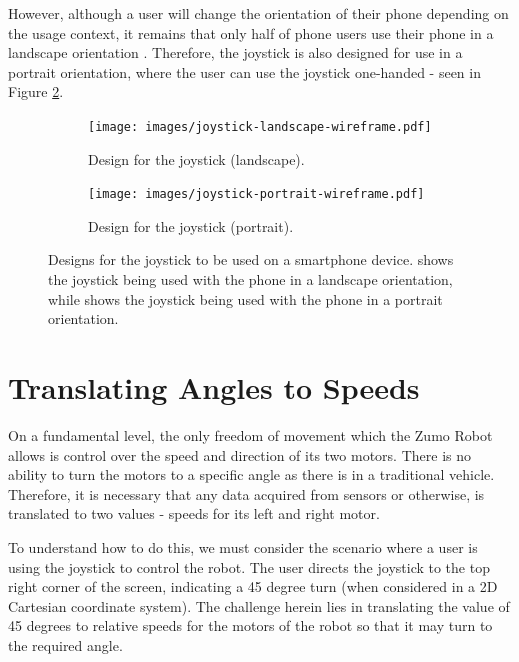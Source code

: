 \documentclass{l4proj}
\begin{document}
However, although a user will change the orientation of their phone depending on the usage context, it remains that only half of phone users use their phone in a landscape orientation \citep{hoober2017design}. Therefore, the joystick is also designed for use in a portrait orientation, where the user can use the joystick one-handed - seen in Figure \ref{fig:joystick-portrait-wireframe}.

\begin{figure}[!ht]
    \centering
    \begin{subfigure}{0.66\textwidth}
        \centering
        \texttt{[image: images/joystick-landscape-wireframe.pdf]}
        \caption{Design for the joystick (landscape).}
        \label{fig:joystick-landscape-wireframe} 
    \end{subfigure}
    \begin{subfigure}{0.33\textwidth}
        \centering
        \texttt{[image: images/joystick-portrait-wireframe.pdf]}
        \caption{Design for the joystick (portrait).}
        \label{fig:joystick-portrait-wireframe} 
    \end{subfigure}
    \caption{Designs for the joystick to be used on a smartphone device.  shows the joystick being used with the phone in a landscape orientation, while  shows the joystick being used with the phone in a portrait orientation.}
    \label{fig:joystick-wireframes}
    
\end{figure}


\section{Translating Angles to Speeds}\label{sec:angle-mapping}
On a fundamental level, the only freedom of movement which the Zumo Robot allows is control over the speed and direction of its two motors. There is no ability to turn the motors to a specific angle as there is in a traditional vehicle. Therefore, it is necessary that any data acquired from sensors or otherwise, is translated to two values - speeds for its left and right motor.

To understand how to do this, we must consider the scenario where a user is using the joystick to control the robot. The user directs the joystick to the top right corner of the screen, indicating a 45 degree turn (when considered in a 2D Cartesian coordinate system). The challenge herein lies in translating the value of 45 degrees to relative speeds for the motors of the robot so that it may turn to the required angle.
\end{document}

